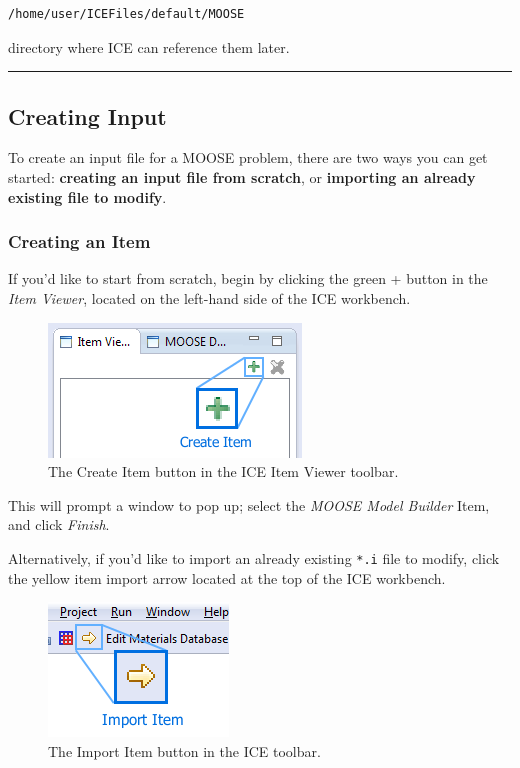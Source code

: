 \begin{verbatim}
/home/user/ICEFiles/default/MOOSE
\end{verbatim}

directory where ICE can reference them later.

\begin{center}\rule{0.5\linewidth}{\linethickness}\end{center}

\subsection{Creating Input}\label{creating-input}

To create an input file for a MOOSE problem, there are two ways you can
get started: \textbf{creating an input file from scratch}, or
\textbf{importing an already existing file to modify}.

\subsubsection{Creating an Item}\label{creating-an-item}

If you'd like to start from scratch, begin by clicking the green +
button in the \emph{Item Viewer}, located on the left-hand side of the
ICE workbench.

\begin{figure}[htbp]
\centering
\includegraphics{figures/ICE_CreateItem.png}
\caption{The Create Item button in the ICE Item Viewer toolbar. }
\end{figure}

This will prompt a window to pop up; select the \emph{MOOSE Model
Builder} Item, and click \emph{Finish}.

Alternatively, if you'd like to import an already existing \texttt{*.i}
file to modify, click the yellow item import arrow located at the top of
the ICE workbench.

\begin{figure}[htbp]
\centering
\includegraphics{figures/ICE_ImportItem.png}
\caption{The Import Item button in the ICE toolbar. }
\end{figure}


